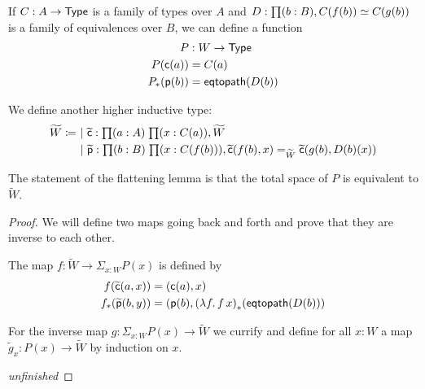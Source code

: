 \begin{lem}
  If $C:A\to\mathsf{Type}$ is a family of types over $A$ and
  $D:\prd{b:B}C(f(b))\simeq{}C(g(b))$ is a family of equivalences over $B$, we
  can define a function
  \begin{align*}
    P &: W\to\mathsf{Type}\\
    P(\mathsf{c}(a)) &= C(a)\\
    {P}_{*}\!\left({\mathsf{p}(b)}\right) &= \mathsf{eqtopath}(D(b))
  \end{align*}

  We define another higher inductive type:
  \begin{align*}
    \widetilde{W} \defeq&\ |\ \cct:\prd{a:A}{x:C(a)}\widetilde{W}\\
    &\ |\
    \ppt:\prd{b:B}{x:C(f(b))}\cct(f(b),x)=_{\widetilde{W}}\cct(g(b),D(b)(x))
  \end{align*}

  The statement of the flattening lemma is that the total space of $P$ is
  equivalent to $\widetilde{W}$.
\end{lem}

\begin{proof}
  We will define two maps going back and forth and prove that they are inverse
  to each other.

  The map $f:\widetilde{W}\to\Sigma_{x:W}P(x)$ is defined by
  \begin{align*}
    f(\widetilde{\mathsf{c}}(a,x)) &= (\mathsf{c}(a),x) \\
    {f}_{*}\!\left({\widetilde{\mathsf{p}}(b,y)}\right) &= (\mathsf{p}(b),{(\lambda{}f.\,f\,x)}_{*}\!\left({\mathsf{eqtopath}(D(b))}\right)
  \end{align*}

  For the inverse map $g:\Sigma_{x:W}P(x)\to\widetilde{W}$ we currify and define
  for all $x:W$ a map $\widetilde{g}_x:P(x)\to\widetilde{W}$ by induction on
  $x$.

  \emph{unfinished}
\end{proof}


